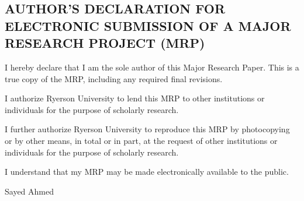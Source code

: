\begin{center} 
\section*{AUTHOR'S DECLARATION FOR ELECTRONIC SUBMISSION OF A MAJOR RESEARCH PROJECT (MRP)}
\end{center}

\thispagestyle{plain}

\vspace{0.75cm}
\noindent 
I hereby declare that I am the sole author of this Major Research Paper. This is a true copy of the MRP, including any required final revisions.

\vspace{0.75cm}
\noindent 
I authorize Ryerson University to lend this MRP to other institutions or individuals for the purpose of scholarly research.

\vspace{0.75cm}
\noindent 
I further authorize Ryerson University to reproduce this MRP by photocopying or by other means, in total or in part, at the request of other institutions or individuals for the purpose of scholarly research.

\vspace{0.75cm}
\noindent 
I understand that my MRP may be made electronically available to the public.

\vspace{0.75cm}
\noindent 
Sayed Ahmed



